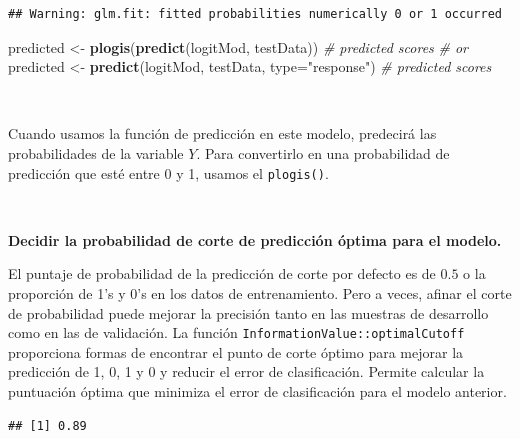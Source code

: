 \documentclass[]{book}
\newenvironment{Shaded}{\begin{snugshade}}{\end{snugshade}}
\newcommand{\KeywordTok}[1]{\textcolor[rgb]{0.13,0.29,0.53}{\textbf{#1}}}
\newcommand{\DataTypeTok}[1]{\textcolor[rgb]{0.13,0.29,0.53}{#1}}
\newcommand{\DecValTok}[1]{\textcolor[rgb]{0.00,0.00,0.81}{#1}}
\newcommand{\StringTok}[1]{\textcolor[rgb]{0.31,0.60,0.02}{#1}}
\newcommand{\CommentTok}[1]{\textcolor[rgb]{0.56,0.35,0.01}{\textit{#1}}}
\newcommand{\OperatorTok}[1]{\textcolor[rgb]{0.81,0.36,0.00}{\textbf{#1}}}
\newcommand{\NormalTok}[1]{#1}
\begin{document}
\begin{verbatim}
## Warning: glm.fit: fitted probabilities numerically 0 or 1 occurred
\end{verbatim}

\begin{Shaded}
\begin{Highlighting}[]
\NormalTok{predicted <-}\StringTok{ }\KeywordTok{plogis}\NormalTok{(}\KeywordTok{predict}\NormalTok{(logitMod, testData))  }\CommentTok{# predicted scores}
\CommentTok{# or}
\NormalTok{predicted <-}\StringTok{ }\KeywordTok{predict}\NormalTok{(logitMod, testData, }\DataTypeTok{type=}\StringTok{"response"}\NormalTok{)  }\CommentTok{# predicted scores}
\end{Highlighting}
\end{Shaded}

~

Cuando usamos la función de predicción en este modelo, predecirá las
probabilidades de la variable \(Y\). Para convertirlo en una
probabilidad de predicción que esté entre 0 y 1, usamos el
\texttt{plogis()}.

~

\textbf{Decidir la probabilidad de corte de predicción óptima para el
modelo.}

El puntaje de probabilidad de la predicción de corte por defecto es de
\(0.5\) o la proporción de 1's y 0's en los datos de entrenamiento. Pero
a veces, afinar el corte de probabilidad puede mejorar la precisión
tanto en las muestras de desarrollo como en las de validación. La
función \texttt{InformationValue::optimalCutoff} proporciona formas de
encontrar el punto de corte óptimo para mejorar la predicción de 1, 0, 1
y 0 y reducir el error de clasificación. Permite calcular la puntuación
óptima que minimiza el error de clasificación para el modelo anterior.

\begin{Shaded}
\end{Shaded}

\begin{verbatim}
## [1] 0.89
\end{verbatim}

~
\end{document}
